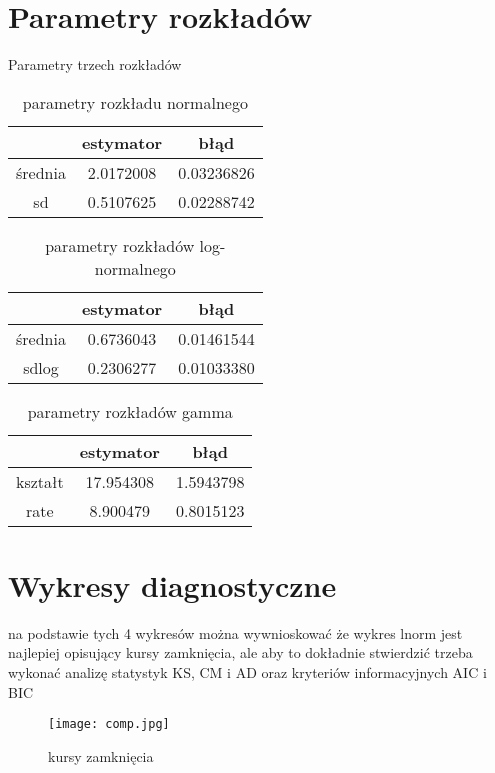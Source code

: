 \documentclass{article}
\begin{document}
\section{Parametry rozkładów}
	Parametry trzech rozkładów
	\begin{table}[h]
		\renewcommand\tablename{Tabela}
		\centering
		\begin{tabular}{|c|c|c|}
			\hline
			& estymator & błąd \\
			\hline
			średnia & 2.0172008 & 0.03236826\\
			\hline
			sd & 0.5107625 & 0.02288742\\
			\hline
		\end{tabular}
		\caption{parametry rozkładu normalnego}
	\end{table}
	\begin{table}[h]
		\renewcommand\tablename{Tabela}
		\centering
		\begin{tabular}{|c|c|c|}
			\hline
			& estymator & błąd \\
			\hline
			średnia & 0.6736043 & 0.01461544 \\
			\hline
			sdlog & 0.2306277 & 0.01033380 \\
			\hline
		\end{tabular}
		\caption{parametry rozkładów log-normalnego}
	\end{table}
	\begin{table}[h]
		\renewcommand\tablename{Tabela}
		\centering
		\begin{tabular}{|c|c|c|}
			\hline
			& estymator & błąd \\
			\hline
			kształt & 17.954308  & 1.5943798 \\
			\hline
			rate & 8.900479  & 0.8015123 \\
			\hline
		\end{tabular}
		\caption{parametry rozkładów gamma}
	\end{table}
\newpage
\section{Wykresy diagnostyczne}
	na podstawie tych 4 wykresów można wywnioskować że wykres
	lnorm jest najlepiej opisujący kursy zamknięcia, ale aby to
	dokładnie stwierdzić trzeba wykonać analizę statystyk KS,
	CM i AD oraz kryteriów informacyjnych AIC i BIC
	\begin{figure}[H]
		\centering
		\renewcommand\figurename{Wykres}
		\texttt{[image: comp.jpg]}
		\caption{kursy zamknięcia}
	\end{figure}
\newpage
\end{document}
